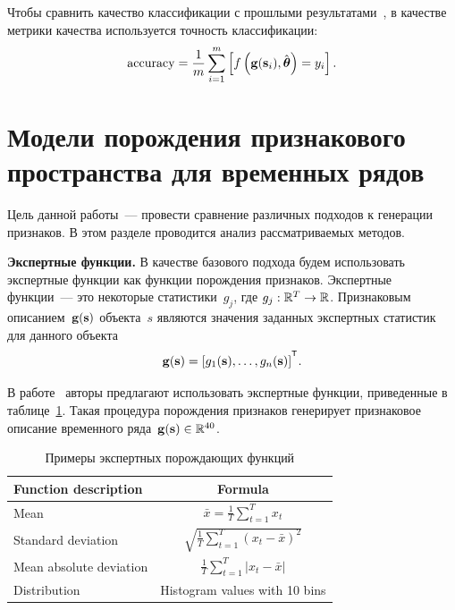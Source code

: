 Чтобы сравнить качество классификации с прошлыми результатами~\cite{karasikov2016feature,ivkin2015ts}, в качестве метрики качества используется точность классификации:
\begin{equation}
	\mathrm{accuracy} = \frac{1}{m} \sum_{i=1}^{m} \left[f\left(\mathbf{g}(\mathbf{s}_i), \hat{\boldsymbol{\theta}} \right)= y_i\right].
	\label{ch6:eq:accuracy}
\end{equation}

\section{Модели порождения признакового пространства для временных рядов}
\label{sec:ch6:feature_generation_models}

Цель данной работы~--- провести сравнение различных подходов к генерации признаков.
В этом разделе проводится анализ рассматриваемых методов.

\textbf{Экспертные функции.}
В качестве базового подхода будем использовать экспертные функции как функции порождения признаков.
Экспертные функции~--- это некоторые статистики~$g_j$, где $g_j: \mathbb{R}^T \rightarrow \mathbb{R}$.
Признаковым описанием~$\mathbf{g}(\mathbf{s})$ объекта~$s$ являются значения заданных экспертных статистик для данного объекта
\[
	\mathbf{g}(\bs) = [g_1(\bs), \dots, g_n(\bs)]^{\T}.
\]

В работе~\cite{kwapisz2011activity} авторы предлагают использовать экспертные функции, приведенные в таблице~\ref{ch6:tbl:expert_functions}.
Такая процедура порождения признаков генерирует признаковое описание временного ряда~$\mathbf{g}(\mathbf{s}) \in \mathbb{R}^{40}$.

\begin{table}[ht]
	\centering
	\caption{Примеры экспертных порождающих функций}
	\begin{tabular}{|l|c|}
		\hline
		\textbf{Function description}    & \textbf{Formula} \\ \hline
		Mean                    & $\bar{x} = \frac{1}{T} \sum_{t=1}^{T} x_t$    \\ \hline
		Standard deviation      & $\sqrt{\frac{1}{T} \sum_{t=1}^{T} (x_t - \bar{x})^2}$    \\ \hline
		Mean absolute deviation & $\frac{1}{T} \sum_{t=1}^{T} |x_t - \bar{x}|$    \\ \hline
		Distribution            &  Histogram values with 10 bins    \\ \hline
	\end{tabular}
	\label{ch6:tbl:expert_functions}
\end{table}

